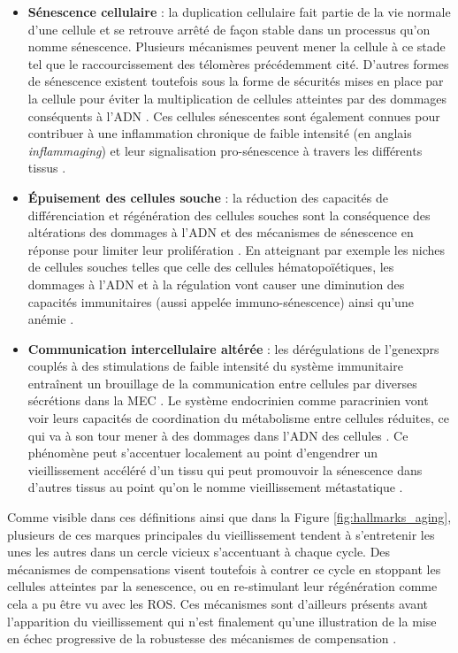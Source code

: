 \begin{itemize}
    \item \textbf{Sénescence cellulaire} : la duplication cellulaire fait partie de la vie normale d'une cellule et se retrouve arrêté de façon stable dans un processus qu'on nomme sénescence. Plusieurs mécanismes peuvent mener la cellule à ce stade tel que le raccourcissement des télomères précédemment cité. D'autres formes de sénescence existent toutefois sous la forme de sécurités mises en place par la cellule pour éviter la multiplication de cellules atteintes par des dommages conséquents à l'\acrshort{ADN} \cite{Khan2017Aug}. Ces cellules sénescentes sont également connues pour contribuer à une inflammation chronique de faible intensité (en anglais \textit{inflammaging}) \cite{Kuilman2010Nov,Franceschi2014} et leur signalisation pro-sénescence à travers les différents tissus \cite{Khan2017Aug}.
    \item \textbf{Épuisement des cellules souche} : la réduction des capacités de différenciation et régénération des cellules souches sont la conséquence des altérations des dommages à l'\acrshort{ADN} et des mécanismes de sénescence en réponse pour limiter leur prolifération \cite{Sharpless2007Sep}. En atteignant par exemple les niches de cellules souches telles que celle des cellules hématopoïétiques, les dommages à l'\acrshort{ADN} et à la régulation vont causer une diminution des capacités immunitaires (aussi appelée immuno-sénescence) ainsi qu'une anémie \cite{Lopez-Otin2013,Baker2016Feb}.
    \item \textbf{Communication intercellulaire altérée} : les dérégulations de l'\glspl{genexpr} couplés à des stimulations de faible intensité du système immunitaire entraînent un brouillage de la communication entre cellules par diverses sécrétions dans la \acrshort{MEC} \cite{Lopez-Otin2013}. Le système endocrinien comme paracrinien vont voir leurs capacités de coordination du métabolisme entre cellules réduites, ce qui va à son tour mener à des dommages dans l'\acrshort{ADN} des cellules \cite{Khan2017Aug}. Ce phénomène peut s'accentuer localement au point d'engendrer un vieillissement accéléré d'un tissu qui peut promouvoir la sénescence dans d'autres tissus au point qu'on le nomme vieillissement métastatique \cite{Lavasani2012Jan}.
\end{itemize}
\hfill


Comme visible dans ces définitions ainsi que dans la Figure \ref{fig:hallmarks_aging}, plusieurs de ces marques principales du vieillissement tendent à s'entretenir les unes les autres dans un cercle vicieux s'accentuant à chaque cycle. Des mécanismes de compensations visent toutefois à contrer ce cycle en stoppant les cellules atteintes par la senescence, ou en re-stimulant leur régénération comme cela a pu être vu avec les ROS. Ces mécanismes sont d'ailleurs présents avant l'apparition du vieillissement qui n'est finalement qu'une illustration de la mise en échec progressive de la robustesse des mécanismes de compensation \cite{Ferrucci2020Feb}.


